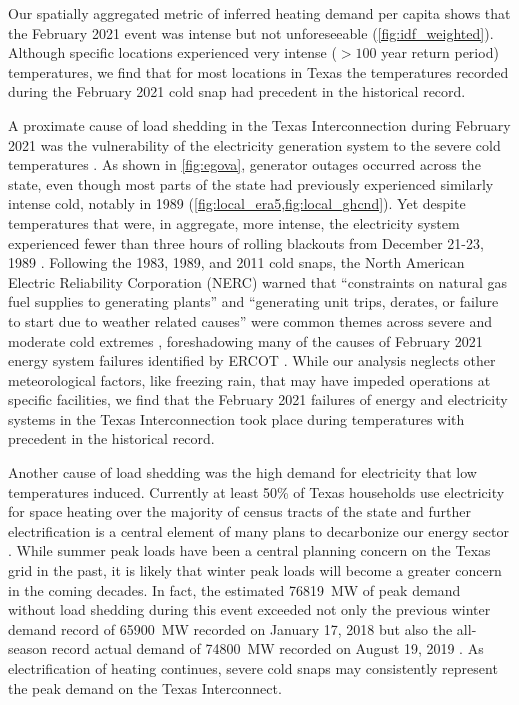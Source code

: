 \documentclass[12pt]{iopart}
\begin{document}
Our spatially aggregated metric of inferred heating demand per capita shows that the February 2021 event was intense but not unforeseeable (\cref{fig:idf_weighted}).
Although specific locations experienced very intense ($>100$ year return period) temperatures, we find that for most locations in Texas the temperatures recorded during the February 2021 cold snap had precedent in the historical record.

A proximate cause of load shedding in the Texas Interconnection during February 2021 was the vulnerability of the electricity generation system to the severe cold temperatures \cite{everhart_iea:2021}.
As shown in \cref{fig:egova}, generator outages occurred across the state, even though most parts of the state had previously experienced similarly intense cold, notably in 1989 (\cref{fig:local_era5,fig:local_ghcnd}).
Yet despite temperatures that were, in aggregate, more intense, the electricity system experienced fewer than three hours of rolling blackouts from December 21-23, 1989 \cite{nerc_operation:1989,osborne_twofreezes:2021}.
Following the 1983, 1989, and 2011 cold snaps, the North American Electric Reliability Corporation (NERC) warned that ``constraints on natural gas fuel supplies to generating plants'' and ``generating unit trips, derates, or failure to start due to weather related causes'' were common themes across severe and moderate cold extremes \cite{nerc_previous:2013}, foreshadowing many of the causes of February 2021 energy system failures identified by ERCOT \cite{ercotpublic_outagesv2:2021,magness_review:2021}.
While our analysis neglects other meteorological factors, like freezing rain, that may have impeded operations at specific facilities, we find that the February 2021 failures of energy and electricity systems in the Texas Interconnection took place during temperatures with precedent in the historical record.

Another cause of load shedding was the high demand for electricity that low temperatures induced.
Currently at least 50\% of Texas households use electricity for space heating over the majority of census tracts of the state \cite{waite_heating:2020} and further electrification is a central element of many plans to decarbonize our energy sector \cite{williams_decarbonization:2012,davis:2018,white_txresidential:2019}.
While summer peak loads have been a central planning concern on the Texas grid in the past, it is likely that winter peak loads will become a greater concern in the coming decades.
In fact, the estimated \SI{76819}{\mega\watt} of peak demand without load shedding during this event \cite{magness_review:2021} exceeded not only the previous winter demand record of \SI{65900}{\mega\watt} recorded on January 17, 2018 but also the all-season record actual demand of \SI{74800}{\mega\watt} recorded on August 19, 2019 \cite{everhart_iea:2021}.
As electrification of heating continues, severe cold snaps may consistently represent the peak demand on the Texas Interconnect.
\end{document}
